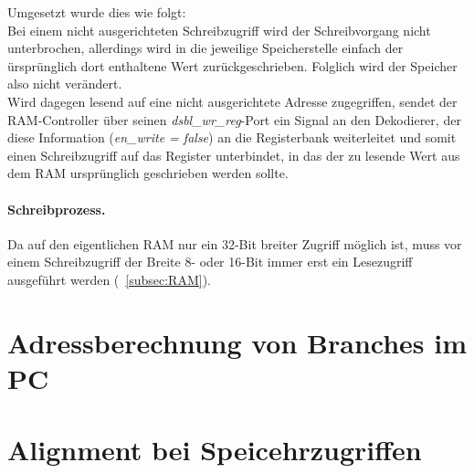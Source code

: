 Umgesetzt wurde dies wie folgt:\\
Bei einem nicht ausgerichteten Schreibzugriff wird der Schreibvorgang nicht unterbrochen, allerdings wird in die jeweilige Speicherstelle einfach der ürsprünglich dort enthaltene Wert zurückgeschrieben.
Folglich wird der Speicher also nicht verändert.\\
Wird dagegen lesend auf eine nicht ausgerichtete Adresse zugegriffen, sendet der RAM-Controller über seinen \textit{dsbl\_wr\_reg}-Port ein Signal an den Dekodierer, der diese Information (\textit{en\_write = false}) an die Registerbank weiterleitet und somit einen Schreibzugriff auf das Register unterbindet, in das der zu lesende Wert aus dem RAM ursprünglich geschrieben werden sollte.

\paragraph{Schreibprozess.} Da auf den eigentlichen RAM nur ein 32-Bit breiter Zugriff möglich ist, muss vor einem Schreibzugriff der Breite 8- oder 16-Bit immer erst ein Lesezugriff ausgeführt werden (~\ref{subsec:RAM}).
\section{Adressberechnung von Branches im PC}
\section{Alignment bei Speicehrzugriffen}

